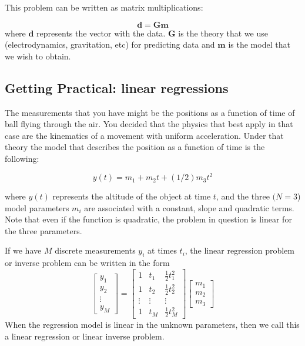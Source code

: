 \documentclass{article}
\begin{document}
This problem can be written as matrix multiplications: 


\begin{equation}
\mathbf{d} = \mathbf{G}\mathbf{m}
\end{equation}
where $\mathbf{d}$ represents the vector with the data. $\mathbf{G}$
is the theory that we use (electrodynamics, gravitation, etc) for
predicting data and $\mathbf{m}$ is the model that we wish to obtain. 


\subsection{Getting Practical: linear regressions}

The measurements that you have might be the positions as a function of
time of ball flying through the air. You decided that the physics that
best apply in that case are the kinematics of a movement with uniform
acceleration. Under that theory the model that describes the position
as a function of time is the following: 

\begin{equation}
y(t) = m_1 + m_2 t + (1/2) m_3 t^2
\end{equation}

where $y(t)$ represents the altitude of the object at time $t$, and
the three $(N=3$) model parameters $m_i$ are associated with a
constant, slope and quadratic terms. Note that even if the function is
quadratic, the problem in question is linear for the three parameters.  

If we have $M$ discrete measurements $y_i$ at times $t_i$, the linear
regression problem or inverse problem can be written in the form 
\begin{equation}
\left[
\begin{array}{c}
  y_1   \\
  y_2   \\
  \vdots \\
  y_M
\end{array}
\right] = 
\left[
\begin{array}{ccc}
  1 & t_1 & {\scriptstyle{\frac{1}{2}}}t_1^2 \\
  1  &t_2 &  {\scriptstyle{\frac{1}{2}}}t_2^2\\
  \vdots & \vdots  & \vdots\\
  1 & t_M &  {\scriptstyle{\frac{1}{2}}}t_M^2
\end{array}
\right]
\left[
\begin{array}{c}
  m_1   \\
  m_2    \\
  m_3
\end{array}
\right] 
\end{equation}
When the regression model is linear in the unknown parameters, then we
call this a linear regression or linear inverse problem.  
\end{document}
